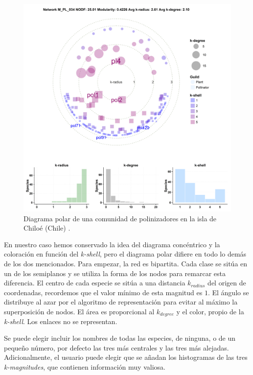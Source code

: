 \begin{figure}[h!]
\centering
\includegraphics[scale=0.6]{Figures/VIS_M_PL_034_polar.png}
\caption[PolarExample]{Diagrama polar de una comunidad de polinizadores en la isla de Chiloé (Chile) \cite{smith2005diversity}.}
\label{fig:VIS_M_PL_034_polar}
\end{figure}

En nuestro caso hemos conservado la idea del diagrama concéntrico y la coloración en función del \textit{k-shell}, pero el diagrama polar difiere en todo lo demás de los dos mencionados. Para empezar, la red es bipartita. Cada clase se sitúa en un de los semiplanos y se utiliza la forma de los nodos para remarcar esta diferencia. El centro de cada especie se sitúa a una distancia $k_{radius}$ del origen de coordenadas, recordemos que el valor mínimo de esta magnitud es $1$. El ángulo se distribuye al azar por el algoritmo de representación para evitar al máximo la superposición de nodos. El área es proporcional al $k_{degree}$ y el color, propio de la \textit{k-shell}. Los enlaces no se representan.

Se puede elegir incluir los nombres de todas las especies, de ninguna, o de un pequeño número, por defecto las tres más centrales y las tres más alejadas. Adicionalmente, el usuario puede elegir que se añadan los histogramas de las tres \textit{k-magnitudes}, que contienen información muy valiosa.

